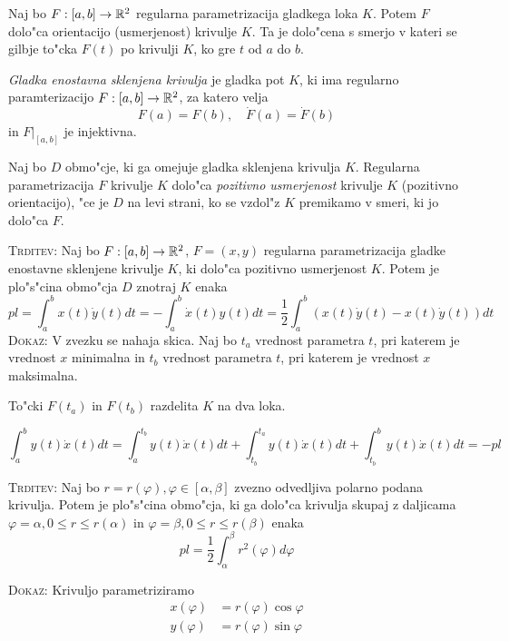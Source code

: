 %
 Naj bo $F: [a, b] \to \mathbb{R}^2$ regularna parametrizacija gladkega loka $K$. Potem $F$ dolo"ca orientacijo (usmerjenost) krivulje $K$. Ta je dolo"cena s smerjo v kateri se gilbje to"cka $F(t)$ po krivulji $K$, ko gre $t$ od $a$ do $b$.

\emph{Gladka enostavna sklenjena krivulja} je gladka pot $K$, ki ima regularno paramterizacijo $F: [a, b] \to \mathbb{R}^2$, za katero velja
\begin{equation*}
F(a) = F(b), \quad \dot{F}(a) = \dot{F}(b)
\end{equation*}
in $F|_{[a, b]}$ je injektivna.

 Naj bo $D$ obmo"cje, ki ga omejuje gladka sklenjena krivulja $K$. Regularna parametrizacija $F$ krivulje $K$ dolo"ca \emph{pozitivno usmerjenost} krivulje $K$ (pozitivno orientacijo), "ce je $D$ na levi strani, ko se vzdol"z $K$ premikamo v smeri, ki jo dolo"ca $F$.

\textsc{Trditev:} Naj bo $F: [a, b] \to \mathbb{R}^2$, $F = (x, y)$ regularna parametrizacija gladke enostavne sklenjene krivulje $K$, ki dolo"ca pozitivno usmerjenost $K$. Potem je plo"s"cina obmo"cja $D$ znotraj $K$ enaka
\begin{equation*}
pl = \int_a^b x(t) \dot{y}(t)dt = - \int_a^b \dot{x}(t) y(t) dt = \dfrac{1}{2} \int_a^b (x(t) \dot{y}(t) - x(t) \dot{y}(t))dt
\end{equation*}
\textsc{Dokaz:} V zvezku se nahaja skica. Naj bo $t_a$ vrednost parametra $t$, pri katerem je vrednost $x$ minimalna in $t_b$ vrednost parametra $t$, pri katerem je vrednost $x$ maksimalna. 

To"cki $F(t_a)$ in $F(t_b)$ razdelita $K$ na dva loka.

\begin{equation*}
\int_a^b y(t) \dot{x}(t) dt = \int_{a}^{t_b} y(t) \dot{x}(t) dt + \int_{t_b}^{t_a} y(t) \dot{x}(t) dt + \int_{t_b}^{b} y(t) \dot{x}(t) dt = -pl
\end{equation*}

\textsc{Trditev:} Naj bo $r = r(\varphi), \varphi \in [\alpha, \beta]$ zvezno odvedljiva polarno podana krivulja. Potem je plo"s"cina obmo"cja, ki ga dolo"ca krivulja skupaj z daljicama $\varphi = \alpha, 0 \leq r \leq r(\alpha)$ in $\varphi = \beta, 0 \leq r \leq r(\beta)$ enaka
\begin{equation*}
pl = \dfrac{1}{2} \int_{\alpha}^{\beta} r^2 (\varphi) d\varphi
\end{equation*}

\textsc{Dokaz:} Krivuljo parametriziramo
\begin{align*}
x(\varphi) &= r(\varphi) \cos \varphi \\
y(\varphi) &= r(\varphi) \sin \varphi
\end{align*}

